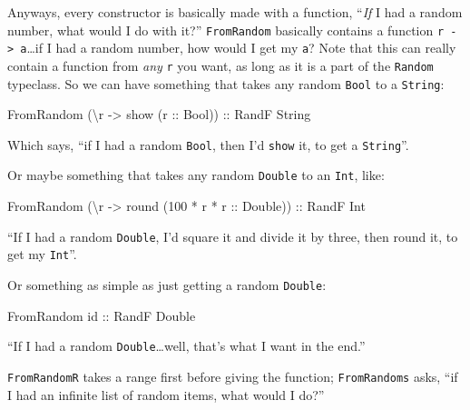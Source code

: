 \documentclass[]{article}
\newenvironment{Shaded}{}{}
\newcommand{\DataTypeTok}[1]{\textcolor[rgb]{0.56,0.13,0.00}{{#1}}}
\newcommand{\DecValTok}[1]{\textcolor[rgb]{0.25,0.63,0.44}{{#1}}}
\newcommand{\OtherTok}[1]{\textcolor[rgb]{0.00,0.44,0.13}{{#1}}}
\newcommand{\FunctionTok}[1]{\textcolor[rgb]{0.02,0.16,0.49}{{#1}}}
\newcommand{\NormalTok}[1]{{#1}}
\begin{document}
Anyways, every constructor is basically made with a function,
``\emph{If} I had a random number, what would I do with it?''
\texttt{FromRandom} basically contains a function
\texttt{r\ -\textgreater{}\ a}\ldots{}if I had a random number, how
would I get my \texttt{a}? Note that this can really contain a function
from \emph{any} \texttt{r} you want, as long as it is a part of the
\texttt{Random} typeclass. So we can have something that takes any
random \texttt{Bool} to a \texttt{String}:

\begin{Shaded}
\begin{Highlighting}[]
\DataTypeTok{FromRandom} \NormalTok{(\textbackslash{}r }\OtherTok{->} \NormalTok{show (}\OtherTok{r ::} \DataTypeTok{Bool}\NormalTok{))}\OtherTok{ ::} \DataTypeTok{RandF} \DataTypeTok{String}
\end{Highlighting}
\end{Shaded}

Which says, ``if I had a random \texttt{Bool}, then I'd \texttt{show}
it, to get a \texttt{String}''.

Or maybe something that takes any random \texttt{Double} to an
\texttt{Int}, like:

\begin{Shaded}
\begin{Highlighting}[]
\DataTypeTok{FromRandom} \NormalTok{(\textbackslash{}r }\OtherTok{->} \NormalTok{round (}\DecValTok{100} \FunctionTok{*} \NormalTok{r }\FunctionTok{*}\OtherTok{ r ::} \DataTypeTok{Double}\NormalTok{))}\OtherTok{ ::} \DataTypeTok{RandF} \DataTypeTok{Int}
\end{Highlighting}
\end{Shaded}

``If I had a random \texttt{Double}, I'd square it and divide it by
three, then round it, to get my \texttt{Int}''.

Or something as simple as just getting a random \texttt{Double}:

\begin{Shaded}
\begin{Highlighting}[]
\DataTypeTok{FromRandom}\OtherTok{ id ::} \DataTypeTok{RandF} \DataTypeTok{Double}
\end{Highlighting}
\end{Shaded}

``If I had a random \texttt{Double}\ldots{}well, that's what I want in
the end.''

\texttt{FromRandomR} takes a range first before giving the function;
\texttt{FromRandoms} asks, ``if I had an infinite list of random items,
what would I do?''
\end{document}
